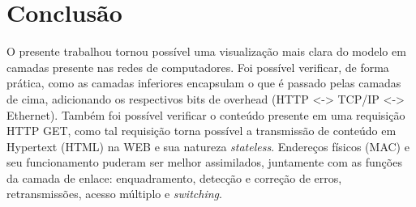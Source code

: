 \documentclass[12pt,a4paper]{report}
\begin{document}
\chapter{Conclusão} O presente trabalhou tornou possível uma visualização mais clara do modelo em camadas presente nas redes de computadores. Foi possível verificar, de forma prática, como as camadas inferiores encapsulam o que é passado pelas camadas de cima, adicionando os respectivos bits de overhead (HTTP <-> TCP/IP <-> Ethernet). Também foi possível verificar o conteúdo presente em uma requisição HTTP GET, como tal requisição torna possível a transmissão de conteúdo em Hypertext (HTML) na WEB e sua natureza \textit{stateless}. Endereços físicos (MAC) e seu funcionamento puderam ser melhor assimilados, juntamente com as funções da camada de enlace: enquadramento, detecção e correção de erros, retransmissões, acesso múltiplo e \textit{switching}.
\end{document}
